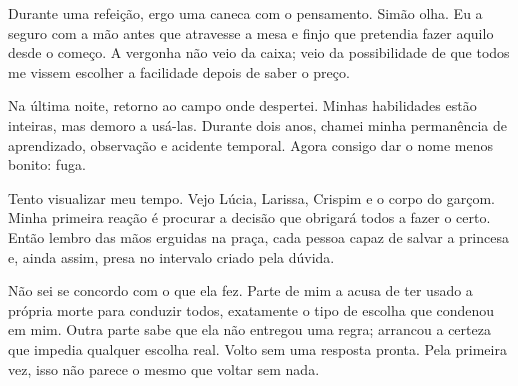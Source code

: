 Durante uma refeição, ergo uma caneca com o pensamento. Simão olha. Eu a seguro com a mão antes que atravesse a mesa e finjo que pretendia fazer aquilo desde o começo. A vergonha não veio da caixa; veio da possibilidade de que todos me vissem escolher a facilidade depois de saber o preço.

Na última noite, retorno ao campo onde despertei. Minhas habilidades estão inteiras, mas demoro a usá-las. Durante dois anos, chamei minha permanência de aprendizado, observação e acidente temporal. Agora consigo dar o nome menos bonito: fuga.

Tento visualizar meu tempo. Vejo Lúcia, Larissa, Crispim e o corpo do garçom. Minha primeira reação é procurar a decisão que obrigará todos a fazer o certo. Então lembro das mãos erguidas na praça, cada pessoa capaz de salvar a princesa e, ainda assim, presa no intervalo criado pela dúvida.

Não sei se concordo com o que ela fez. Parte de mim a acusa de ter usado a própria morte para conduzir todos, exatamente o tipo de escolha que condenou em mim. Outra parte sabe que ela não entregou uma regra; arrancou a certeza que impedia qualquer escolha real. Volto sem uma resposta pronta. Pela primeira vez, isso não parece o mesmo que voltar sem nada.

